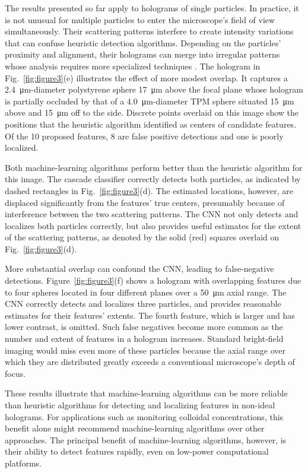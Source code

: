 \documentclass[10pt,letterpaper]{article}
\begin{document}
The results presented so far apply to holograms of single
particles.
In practice, it is not unusual for multiple particles to enter 
the microscope's field of view simultaneously.
Their scattering patterns interfere to create
intensity variations that can confuse heuristic detection algorithms.
Depending on the particles' proximity and alignment, their
holograms can merge into irregular patterns whose analysis
requires more specialized techniques \cite{perry12,fung13}.
The hologram in Fig.~\ref{fig:figure3}(e)
illustrates the effect of more modest overlap.
It captures a \SI{2.4}{\um}-diameter
polystyrene sphere \SI{17}{\um} above the focal plane
whose hologram is partially occluded by that 
of a \SI{4.0}{\um}-diameter TPM sphere situated \SI{15}{\um}
above and \SI{15}{\um} off to the side.
Discrete points overlaid on this image show the
positions that the heuristic algorithm
identified as centers of candidate features.
Of the 10 proposed features, 8 are false positive detections
and one is poorly localized.

Both machine-learning algorithms perform better than the
heuristic algorithm for this image.
The cascade classifier correctly
detects both particles, as indicated by dashed rectangles
in Fig.~\ref{fig:figure3}(d).
The estimated locations, however, are displaced significantly
from the features' true centers, presumably because of
interference between the two scattering patterns.
The CNN not only detects and localizes
both particles correctly, but also provides useful estimates for the
extent of the scattering patterns, as denoted by the solid (red)
squares overlaid on Fig.~\ref{fig:figure3}(d).

More substantial overlap can confound the CNN,
leading to false-negative detections.
Figure~\ref{fig:figure3}(f) shows a hologram with
overlapping features due to four spheres
located in four different planes over a \SI{50}{\um} axial
range.
The CNN correctly detects and
localizes three particles, and provides reasonable
estimates for their features' extents.
The fourth feature, which is larger and has lower contrast,
is omitted.
Such false negatives become more common as the number and
extent of features in a hologram increases.
Standard bright-field imaging would miss even
more of these particles because the axial range
over which they are distributed greatly exceeds
a conventional microscope's depth of focus.

These results illustrate that machine-learning algorithms can
be more reliable than heuristic algorithms for detecting and
localizing features in non-ideal holograms.
For applications such as monitoring colloidal concentrations, this
benefit alone might recommend machine-learning algorithms
over other approaches.
The principal benefit of machine-learning algorithms, however,
is their ability to detect features rapidly, even on
low-power computational platforms.
\end{document}
